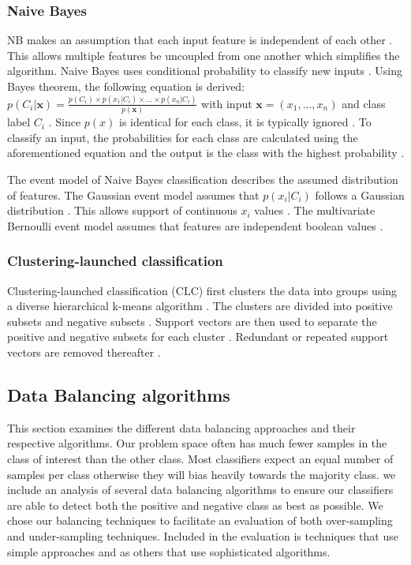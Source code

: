 \documentclass{sig-alternate-05-2015}
\begin{document}
	\subsubsection{Naive Bayes}
	NB makes an assumption that each input feature is independent of each other \cite{Lewis1998, rish2001empirical}. This allows multiple features be uncoupled from one another which simplifies the algorithm. Naive Bayes uses conditional probability to classify new inputs \cite{Lewis1998}. Using Bayes theorem, the following equation is derived: $p(C_i|\textbf{x}) = \frac{p(C_i) \times p(x_1|C_i) \times...\times p(x_n|C_i)}{p(\textbf{x})}$ with input $\textbf{x} = (x_1,...,x_n)$ and class label $C_i$ \cite{Lewis1998, rish2001empirical}. Since $p(\textit{x})$ is identical for each class, it is typically ignored \cite{rish2001empirical}. To classify an input, the probabilities for each class are calculated using the aforementioned equation and the output is the class with the highest probability \cite{Lewis1998}.
	
	The event model of Naive Bayes classification describes the assumed distribution of features. The Gaussian event model assumes that $p(x_i|C_i)$ follows a Gaussian distribution \cite{John:1995:ECD:2074158.2074196}. This allows support of continuous $x_i$ values \cite{John:1995:ECD:2074158.2074196}. The multivariate Bernoulli event model assumes that features are independent boolean values \cite{mccallum1998comparison}.
	
	\subsubsection{Clustering-launched classification}
	Clustering-launched classification (CLC) first clusters the data into groups using a diverse hierarchical k-means algorithm \cite{Luo20097562}. The clusters are divided into positive subsets and negative subsets \cite{Luo20097562}. Support vectors are then used to separate the positive and negative subsets for each cluster \cite{Luo20097562}. Redundant or repeated support vectors are removed thereafter \cite{Luo20097562}.
	
	\subsection{Data Balancing algorithms}
	\label{sec:data_balancing_algorithms}
	This section examines the different data balancing approaches and their respective algorithms. Our problem space often has much fewer samples in the class of interest than the other class. Most classifiers expect an equal number of samples per class otherwise they will bias heavily towards the majority class. we include an analysis of several data balancing algorithms to ensure our classifiers are able to detect both the positive and negative class as best as possible. We chose our balancing techniques to facilitate an evaluation of both over-sampling and under-sampling techniques. Included in the evaluation is techniques that use simple approaches and as others that use sophisticated algorithms.
\end{document}
